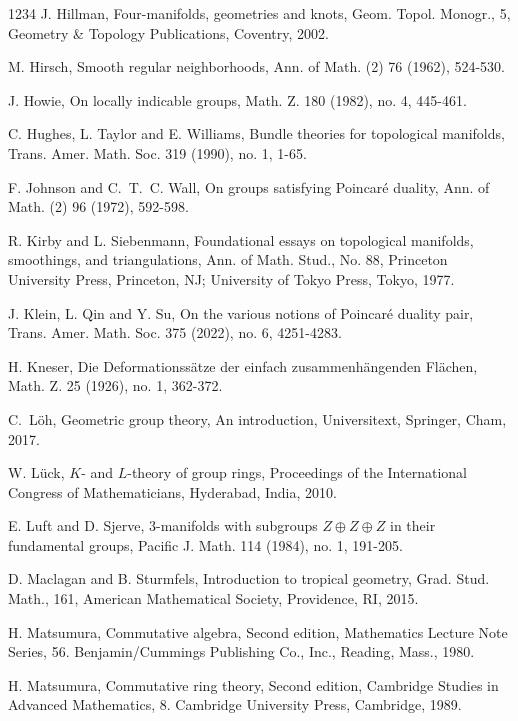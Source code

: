 \documentclass[12pt]{amsart}
\theoremstyle{plain}
\theoremstyle{definition}
\theoremstyle{question}
\theoremstyle{remark}
\theoremstyle{assumption}
\numberwithin{equation}{section}
\theoremstyle{bigthm}
\begin{document}
\begin{thebibliography}{1234}
 J. Hillman, Four-manifolds, geometries and knots, Geom. Topol. Monogr., 5, Geometry \& Topology Publications, Coventry, 2002.

 M. Hirsch, Smooth regular neighborhoods, Ann. of Math. (2) 76 (1962), 524-530.

 J. Howie, On locally indicable groups, Math. Z. 180 (1982), no. 4, 445-461.

 C. Hughes, L. Taylor and E. Williams, Bundle theories for topological manifolds, Trans. Amer. Math. Soc. 319 (1990), no. 1, 1-65.

 F. Johnson and C.~T.~C. Wall, On groups satisfying Poincar\'{e} duality, Ann. of Math. (2) 96 (1972), 592-598.

 R. Kirby and L. Siebenmann, Foundational essays on topological manifolds, smoothings, and triangulations, Ann. of Math. Stud., No. 88, Princeton University Press, Princeton, NJ; University of Tokyo Press, Tokyo, 1977.

 J. Klein, L. Qin and Y. Su, On the various notions of Poincar\'{e} duality pair, Trans. Amer. Math. Soc. 375 (2022), no. 6, 4251-4283.

 H. Kneser, Die Deformationss\"{a}tze der einfach zusammenh\"{a}ngenden Fl\"{a}chen, Math. Z. 25 (1926), no. 1, 362-372.

 C.~L\"{o}h, Geometric group theory, An introduction, Universitext, Springer, Cham, 2017.

 W. L\"{u}ck, $K$- and $L$-theory of group rings, Proceedings of the International Congress of Mathematicians, Hyderabad, India, 2010.

 E. Luft and D. Sjerve, $3$-manifolds with subgroups $Z \oplus Z \oplus Z$ in their fundamental groups, Pacific J. Math. 114 (1984), no. 1, 191-205.

 D. Maclagan and B. Sturmfels, Introduction to tropical geometry, Grad. Stud. Math., 161, American Mathematical Society, Providence, RI, 2015.

 H. Matsumura, Commutative algebra, Second edition, Mathematics Lecture Note Series, 56. Benjamin/Cummings Publishing Co., Inc., Reading, Mass., 1980.

 H. Matsumura, Commutative ring theory, Second edition, Cambridge Studies in Advanced Mathematics, 8. Cambridge University Press, Cambridge, 1989.


\end{thebibliography}
\end{document}
